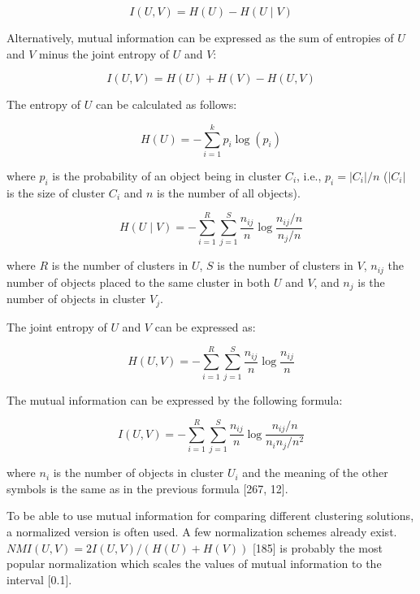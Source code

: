 \documentclass[11pt,openany,executivepaper]{book}
\begin{document}
\begin{equation}
I(U, V)=H(U)-H(U \mid V)
\end{equation}

Alternatively, mutual information can be expressed as the sum of entropies of $U$ and $V$ minus the joint entropy of $U$ and $V$:

\begin{equation}
I(U, V)=H(U)+H(V)-H(U, V)
\end{equation}

The entropy of $U$ can be calculated as follows:

\begin{equation}
H(U)=-\sum_{i=1}^{k} p_{i} \log \left(p_{i}\right)
\end{equation}

where $p_{i}$ is the probability of an object being in cluster $C_{i}$, i.e., $p_{i}=\left|C_{i}\right| / n$ ($\left|C_{i}\right|$ is the size of cluster $C_{i}$ and $n$ is the number of all objects).

\begin{equation}
H(U \mid V)=-\sum_{i=1}^{R} \sum_{j=1}^{S} \frac{n_{i j}}{n} \log \frac{n_{i j} / n}{n_{j} / n}
\end{equation}

where $R$ is the number of clusters in $U$, $S$ is the number of clusters in $V$, $n_{i j}$ the number of objects placed to the same cluster in both $U$ and $V$, and $n_{j}$ is the number of objects in cluster $V_{j}$.

The joint entropy of $U$ and $V$ can be expressed as:

\begin{equation}
H(U, V)=-\sum_{i=1}^{R} \sum_{j=1}^{S} \frac{n_{i j}}{n} \log \frac{n_{i j}}{n}
\end{equation}

The mutual information can be expressed by the following formula:

\begin{equation}
I(U, V)=-\sum_{i=1}^{R} \sum_{j=1}^{S} \frac{n_{i j}}{n} \log \frac{n_{i j} / n}{n_{i} n_{j} / n^{2}}
\end{equation}

where $n_{i}$ is the number of objects in cluster $U_{i}$ and the meaning of the other symbols is the same as in the previous formula [267, 12].

To be able to use mutual information for comparing different clustering solutions, a normalized version is often used. A few normalization schemes already exist. $NMI(U, V)=2 I(U, V) /(H(U)+H(V))$ [185] is probably the most popular normalization which scales the values of mutual information to the interval [0.1].
\end{document}
